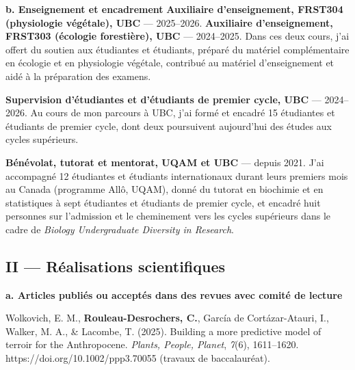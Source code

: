 \documentclass[12pt]{article}
\begin{document}
\textbf{b. Enseignement et encadrement} 
\textbf{Auxiliaire d'enseignement, FRST304 (physiologie végétale), UBC} --- 2025--2026. 
\textbf{Auxiliaire d'enseignement, FRST303 (écologie forestière), UBC} --- 2024--2025. 
Dans ces deux cours, j'ai offert du soutien aux étudiantes et étudiants, préparé du matériel complémentaire en écologie et en physiologie végétale, contribué au matériel d'enseignement et aidé à la préparation des examens.

\textbf{Supervision d'étudiantes et d'étudiants de premier cycle, UBC} --- 2024--2026. 
Au cours de mon parcours à UBC, j'ai formé et encadré 15 étudiantes et étudiants de premier cycle, dont deux poursuivent aujourd'hui des études aux cycles supérieurs.

\textbf{Bénévolat, tutorat et mentorat, UQAM et UBC} --- depuis 2021. 
J'ai accompagné 12 étudiantes et étudiants internationaux durant leurs premiers mois au Canada (programme Allô, UQAM), donné du tutorat en biochimie et en statistiques à sept étudiantes et étudiants de premier cycle, et encadré huit personnes sur l'admission et le cheminement vers les cycles supérieurs dans le cadre de \textit{Biology Undergraduate Diversity in Research}.

\subsection*{II --- Réalisations scientifiques}

\textbf{a. Articles publiés ou acceptés dans des revues avec comité de lecture} 

Wolkovich, E. M., \textbf{Rouleau-Desrochers, C.}, García de Cortázar-Atauri, I., Walker, M. A., \& Lacombe, T. (2025). Building a more predictive model of terroir for the Anthropocene. \textit{Plants, People, Planet}, \textit{7}(6), 1611--1620. https://doi.org/10.1002/ppp3.70055 (travaux de baccalauréat). 
\end{document}
